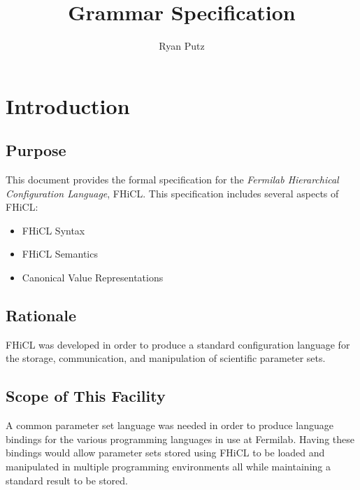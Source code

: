 \documentclass{article}
\begin{document}
\setlength{\parindent}{0in}
\title{Grammar Specification}
\author{Ryan Putz}
\maketitle
\newpage

\tableofcontents
\newpage

\section{Introduction}
        \subsection{Purpose}
        {
                This document provides the formal specification
                for the \emph{Fermilab Hierarchical Configuration Language}, FHiCL.
                This specification includes several aspects of FHiCL:
                \begin{itemize}
                        \item FHiCL Syntax
                        \item FHiCL Semantics
                        \item Canonical Value Representations
                \end{itemize}
        }

        \subsection{Rationale}
        {
                FHiCL was developed in order to produce
                a standard configuration language for the storage,
                communication, 
                and manipulation
                of scientific parameter sets.
        }
        
        \subsection{Scope of This Facility}
        {
                A common parameter set language was needed 
                in order to produce language bindings 
                for the various programming languages in use 
                at Fermilab.
                Having these bindings would allow parameter sets
                stored using FHiCL
                to be loaded 
                and manipulated in multiple programming environments
                all while maintaining a standard result to be stored.
        }
        \newpage        
\end{document}
